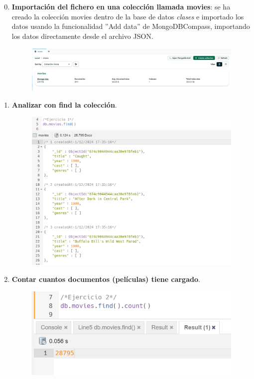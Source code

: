 \documentclass[a4paper,onecolumn]{article}
\begin{document}
\begin{sloppypar}
\begin{enumerate} \setcounter{enumi}{-1}
    \item \textbf{Importación del fichero en una colección llamada movies}: se ha creado la colección movies dentro de la base de datos \textit{clases} e
    importado los datos usando la funcionalidad ''Add data'' de MongoDBCompass, importando los datos directamente desde el archivo JSON.
    \begin{center}
        \begin{figure}[h!]
            \includegraphics[width=\textwidth]{querys/0.png}
        \end{figure}
    \end{center}
    \item \textbf{Analizar con find la colección}.
    \begin{center}
        \begin{figure}[h!]
            \includegraphics[width=\textwidth]{querys/1.png}
        \end{figure}
    \end{center}
    \item \textbf{Contar cuantos documentos (películas) tiene cargado}.
    \begin{center}
        \begin{figure}[H]
            \includegraphics[width=\textwidth]{querys/2.png}

\end{figure}
\end{center}
\end{enumerate}
\end{sloppypar}
\end{document}
